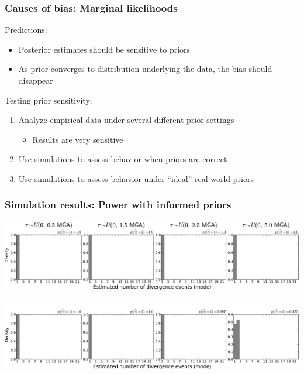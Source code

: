 \begin{frame}
    \frametitle{Causes of bias: Marginal likelihoods}
    Predictions:\\
    \begin{itemize}
        \item Posterior estimates should be sensitive to priors
        \item As prior converges to distribution underlying the data, the
            bias should disappear
    \end{itemize}
    Testing prior sensitivity: \\
    \begin{enumerate}
        \item Analyze empirical data under several different prior settings
            \begin{itemize}
                \item Results are very sensitive
            \end{itemize}
        \item Use simulations to assess behavior when priors are correct
        \item<2-> Use simulations to assess behavior under ``ideal'' real-world priors
    \end{enumerate}
\end{frame}

\begin{frame}[t]
    \frametitle{Simulation results: Power with informed priors}
    \vspace{1cm}
        \centerline{
        \includegraphics[width=\textwidth]{../images/old-sims_power_psi_mode.pdf}}
        \vspace{0mm}
        \centerline{
        \includegraphics[width=\textwidth]{../images/old-sims-inform10_power_psi_mode_headless.pdf}}
\end{frame}


